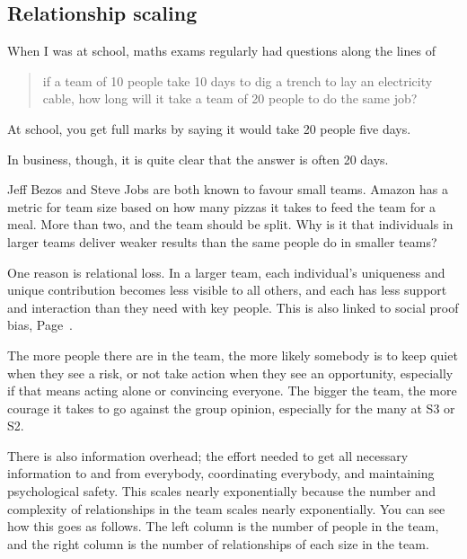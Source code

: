 \subsection{Relationship scaling}
\label{relationship-scaling}
When I was at school, maths exams regularly had questions along the lines of \begin{quote} if a team of 10 people take 10 days to dig a trench to lay an electricity cable, how long will it take a team of 20 people to do the same job? 
\end{quote} 
At school, you get full marks by saying it would take 20 people five days.


In business, though, it is quite clear that the answer is often 20 days. 


Jeff Bezos and Steve Jobs are both known to favour small teams. Amazon has a metric for team size based on how many pizzas it takes to feed the team for a meal. More than two, and the team should be split. Why is it that individuals in larger teams deliver weaker results than the same people do in smaller teams?


One reason is relational loss\cite{mueller-why-larger-teams-perform-worse}. In a larger team, each individual's uniqueness and unique contribution becomes less visible to all others, and each has less support and interaction than they need with key people. This is also linked to social proof bias, Page~\pageref{section:social-proof-bias}. 


The more people there are in the team, the more likely somebody is to keep quiet when they see a risk, or not take action when they see an opportunity, especially if that means acting alone or convincing everyone. The bigger the team, the more courage it takes to go against the group opinion, especially for the many at S3 or S2.


There is also information overhead; the effort needed to get all necessary information to and from everybody, coordinating everybody, and maintaining psychological safety. This scales nearly exponentially because the number and complexity of relationships in the team scales nearly exponentially. You can see how this goes as follows. The left column is the number of people in the team, and the right column is the number of relationships of each size in the team.


